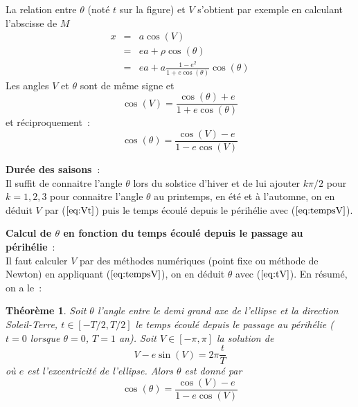 \documentclass[a4paper,11pt]{book}
\newtheorem{thm}{Théorème}
\begin{document}
\begin{giacjshere}
La relation entre $\theta$ (not\'e $t$ sur la figure)
et $V$ s'obtient par exemple en calculant 
l'abscisse de $M$ 
\begin{eqnarray*} 
x &= &a \cos(V) \\
 &= & ea + \rho \cos(\theta) \\
 &= & ea + a\frac{1-e^2}{1+e\cos(\theta)} \cos(\theta)
\end{eqnarray*}
Les angles $V$ et $\theta$ sont de même signe et
\begin{equation} \label{eq:Vt}
 \cos(V) = \frac{\cos(\theta)+e}{1+e\cos(\theta)}
\end{equation}
et réciproquement~:
\begin{equation} \label{eq:tV}
 \cos(\theta)=\frac{\cos(V)-e}{1-e \cos(V)} 
\end{equation}

{\bf Durée des saisons~}:\\
Il suffit de connaitre l'angle $\theta$ lors du solstice d'hiver et
de lui ajouter $k\pi/2$ pour $k=1,2,3$ pour connaitre l'angle $\theta$
au printemps, en été et à l'automne, on en déduit $V$ par (\(\ref{eq:Vt}\)) 
puis le temps écoulé depuis le p\'erihélie avec (\(\ref{eq:tempsV}\)).

{\bf Calcul de $\theta$ en fonction du temps écoulé depuis le passage
au p\'erihélie}~:\\
Il faut calculer $V$ par des méthodes numériques (point fixe ou 
méthode de Newton) en appliquant (\(\ref{eq:tempsV}\)), on en déduit
$\theta$ avec (\(\ref{eq:tV}\)).
En résumé, on a le~:
\begin{thm}
Soit $\theta$ l'angle entre le demi grand axe de l'ellipse et 
la direction Soleil-Terre, $t\in [-T/2,T/2]$ le temps écoulé depuis le passage
au périhélie ($t=0$ lorsque $\theta=0$, $T=1$ an). Soit $V\in [-\pi,\pi]$ 
la solution de 
\[  V - e \sin(V) = 2\pi \frac{t}{T} \]
où $e$ est l'excentricité de l'ellipse.
Alors $\theta$ est donné par
\[  \cos(\theta)=\frac{\cos(V)-e}{1-e \cos(V)}  \]
\end{thm}


\end{giacjshere}
\end{document}

